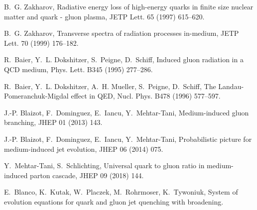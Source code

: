 \documentclass[preprint,12pt]{elsarticle}
\begin{document}
\begin{thebibliography}{99}
B.~G. Zakharov, {Radiative energy loss of high-energy quarks in finite size
  nuclear matter and quark - gluon plasma}, JETP Lett. 65 (1997) 615--620.
  {}%

B.~G. Zakharov, {Transverse spectra of radiation processes in-medium}, JETP
  Lett. 70 (1999) 176--182.
  {}

R.~Baier, Y.~L. Dokshitzer, S.~Peigne, D.~Schiff, {Induced gluon radiation in a
  QCD medium}, Phys. Lett. B345 (1995) 277--286.
  {}

R.~Baier, Y.~L. Dokshitzer, A.~H. Mueller, S.~Peigne, D.~Schiff, {The
  Landau-Pomeranchuk-Migdal effect in QED}, Nucl. Phys. B478 (1996) 577--597.
  {}

J.-P. Blaizot, F.~Dominguez, E.~Iancu, Y.~Mehtar-Tani, {Medium-induced gluon
  branching}, JHEP 01 (2013) 143.
{}

J.-P. Blaizot, F.~Dominguez, E.~Iancu, Y.~Mehtar-Tani, {Probabilistic picture
  for medium-induced jet evolution}, JHEP 06 (2014) 075.
{}

Y.~Mehtar-Tani, S.~Schlichting, {Universal quark to gluon ratio in
  medium-induced parton cascade}, JHEP 09 (2018) 144.
{}

E.~Blanco, K.~Kutak, W.~Placzek, M.~Rohrmoser, K.~Tywoniuk, {System of
  evolution equations for quark and gluon jet quenching with broadening.} %
{}


\end{thebibliography}
\end{document}

